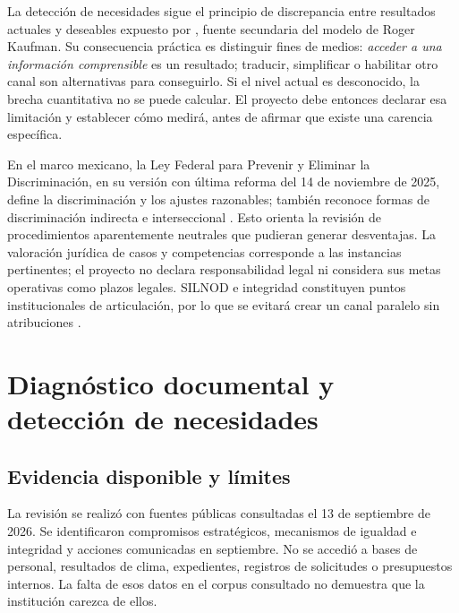 \documentclass[12pt,letterpaper,oneside]{article}
\begin{document}
La detección de necesidades sigue el principio de discrepancia entre resultados actuales y deseables expuesto por \textcite{fga10kaufman}, fuente secundaria del modelo de Roger Kaufman. Su consecuencia práctica es distinguir fines de medios: \emph{acceder a una información comprensible} es un resultado; traducir, simplificar o habilitar otro canal son alternativas para conseguirlo. Si el nivel actual es desconocido, la brecha cuantitativa no se puede calcular. El proyecto debe entonces declarar esa limitación y establecer cómo medirá, antes de afirmar que existe una carencia específica.

En el marco mexicano, la Ley Federal para Prevenir y Eliminar la Discriminación, en su versión con última reforma del 14 de noviembre de 2025, define la discriminación y los ajustes razonables; también reconoce formas de discriminación indirecta e interseccional \parencite[art. 1]{fga10lfped}. Esto orienta la revisión de procedimientos aparentemente neutrales que pudieran generar desventajas. La valoración jurídica de casos y competencias corresponde a las instancias pertinentes; el proyecto no declara responsabilidad legal ni considera sus metas operativas como plazos legales. SILNOD e integridad constituyen puntos institucionales de articulación, por lo que se evitará crear un canal paralelo sin atribuciones \parencite{fga10igualdad,fga10integridad}.

\section{Diagnóstico documental y detección de necesidades}
\subsection{Evidencia disponible y límites}
La revisión se realizó con fuentes públicas consultadas el 13 de septiembre de 2026. Se identificaron compromisos estratégicos, mecanismos de igualdad e integridad y acciones comunicadas en septiembre. No se accedió a bases de personal, resultados de clima, expedientes, registros de solicitudes o presupuestos internos. La falta de esos datos en el corpus consultado no demuestra que la institución carezca de ellos.
\end{document}
